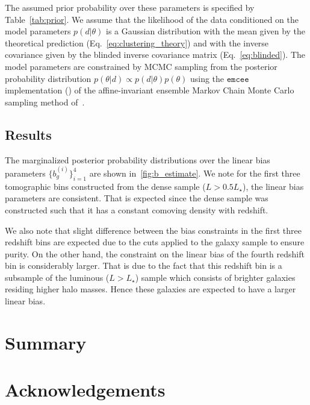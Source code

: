 \documentclass[fleqn,usenatbib,useAMS]{mnras}
\begin{document}
The assumed prior probability over these parameters is specified by Table~\ref{tab:prior}. We assume that the likelihood of the data conditioned on the model parameters $p(d|\theta)$ is a Gaussian distribution with the mean given by the theoretical prediction (Eq.~\ref{eq:clustering_theory}) and with the inverse covariance given by the blinded inverse covariance matrix (Eq.~\ref{eq:blinded}). The model parameters are constrained by MCMC sampling from the posterior probability distribution $p(\theta | d) \propto p(d|\theta)p(\theta)$ using the $\mathtt{emcee}$ implementation (\citealt{emcee}) of the affine-invariant ensemble Markov Chain Monte Carlo sampling method of~\citet{goodman2010}. 


\subsection{Results}

The marginalized posterior probability distributions over the linear bias parameters $\{b_{g}^{(i)}\}_{i=1}^{4}$ are shown in~\ref{fig:b_estimate}. We note for the first three tomographic bins constructed from the dense sample ($L>0.5 L_{\star}$), the linear bias parameters are consistent. 
That is expected since the dense sample was constructed such that it has a constant comoving density with redshift. 

We also note that slight difference between the bias constraints in the first three redshift bins are expected due to the cuts applied to the galaxy sample to ensure purity. On the other hand, the constraint on the linear bias of the fourth redshift bin is considerably larger. That is due to the fact that this redshift bin is a subsample of the luminous ($L>L_{\star}$) sample which consists of brighter galaxies residing higher halo masses. Hence these galaxies are expected to have a larger linear bias. 

\section{Summary}\label{sec:summary} 


\section*{Acknowledgements}





 
\end{document}
